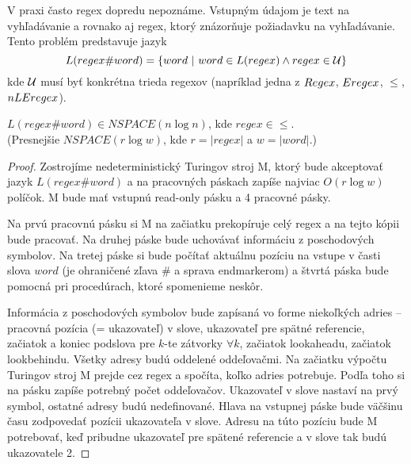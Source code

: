 V praxi často regex dopredu nepoznáme. Vstupným údajom je text na vyhľadávanie a rovnako aj regex, ktorý znázorňuje požiadavku na vyhľadávanie. Tento problém predstavuje jazyk $$L(regex\#word) = \lbrace word~|~word \in L(regex) \wedge regex \in \cal U \rbrace$$
kde ${\cal U}$ musí byť konkrétna trieda regexov (napríklad jedna z $Regex$, $Eregex$, $\le$, $nLEregex$).

\begin{veta}
$L(regex\#word) \in NSPACE(n \log n)$, kde $regex \in \le$. 
\\ (Presnejšie $NSPACE(r \log w)$, kde $r = |regex|$ a $w = |word|$.)
\end{veta}
\begin{proof}
Zostrojíme nedeterministický Turingov stroj M, ktorý bude akceptovať jazyk $L(regex\#word)$ a na pracovných páskach zapíše najviac $O(r\log w)$ políčok. M bude mať vstupnú read-only pásku a 4 pracovné pásky.

Na prvú pracovnú pásku si M na začiatku prekopíruje celý regex a na tejto kópii bude pracovať. Na druhej páske bude uchovávať informáciu z poschodových symbolov. Na tretej páske si bude počítať aktuálnu pozíciu na vstupe v časti slova $word$ (je ohraničené zľava \# a sprava endmarkerom) a štvrtá páska bude pomocná pri procedúrach, ktoré spomenieme neskôr.

Informácia z poschodových symbolov bude zapísaná vo forme niekoľkých adries -- pracovná pozícia (= ukazovateľ) v slove, ukazovateľ pre spätné referencie, začiatok a koniec podslova pre $k$-te zátvorky $\forall k$, začiatok lookaheadu, začiatok lookbehindu. Všetky adresy budú oddelené oddeľovačmi. Na začiatku výpočtu Turingov stroj M prejde cez regex a spočíta, koľko adries potrebuje. Podľa toho si na pásku zapíše potrebný počet oddeľovačov. Ukazovateľ v slove nastaví na prvý symbol, ostatné adresy budú nedefinované. Hlava na vstupnej páske bude väčšinu času zodpovedať pozícii ukazovateľa v slove. Adresu na túto pozíciu bude M potrebovať, keď pribudne ukazovateľ pre spätené referencie a v slove tak budú ukazovatele 2.


\end{proof}
